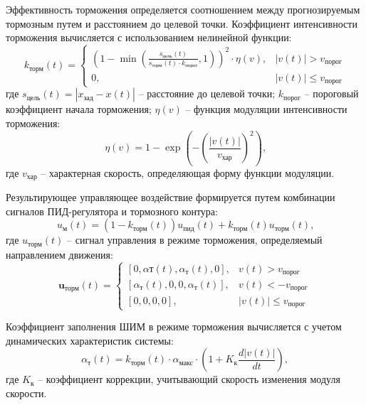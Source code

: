 Эффективность торможения определяется соотношением между прогнозируемым тормозным путем
и расстоянием до целевой точки. Коэффициент интенсивности торможения вычисляется с использованием нелинейной функции:
\begin{equation}\label{eq:braking_intensity_expanded}
	k_{\text{торм}}(t) = \begin{cases}
		\left(1 - \min\left(\frac{s_{\text{цель}}(t)}{s_{\text{торм}}(t) \cdot k_{\text{порог}}}, 1\right)\right)^2 \cdot \eta(v), & |v(t)| > v_{\text{порог}}    \\
		0,                                                                                                                         & |v(t)| \leq v_{\text{порог}}
	\end{cases}
\end{equation}
где $s_{\text{цель}}(t) = |x_{\text{зад}} - x(t)|$ -- расстояние до целевой точки;
$k_{\text{порог}}$ -- пороговый коэффициент начала торможения;
$\eta(v)$ -- функция модуляции интенсивности торможения:
\begin{equation}\label{eq:modulation_function}
	\eta(v) = 1 - \exp\left(-\left(\frac{|v(t)|}{v_{\text{хар}}}\right)^2\right)\text{,}
\end{equation}
где $v_{\text{хар}}$ -- характерная скорость, определяющая форму функции модуляции.

Результирующее управляющее воздействие формируется путем комбинации сигналов ПИД-регулятора и тормозного контура:
\begin{equation}\label{eq:combined_control}
	u_{\text{м}}(t) = (1 - k_{\text{торм}}(t))u_{\text{пид}}(t) + k_{\text{торм}}(t)u_{\text{торм}}(t)\text{,}
\end{equation}
где $u_{\text{торм}}(t)$ -- сигнал управления в режиме торможения, определяемый направлением движения:
\begin{equation}\label{eq:braking_control_expanded}
	\mathbf{u}_{\text{торм}}(t) = \begin{cases}
		[0, \alpha{\text{т}}(t), \alpha_{\text{т}}(t), 0],  & v(t) > v_{\text{порог}}      \\
		[\alpha_{\text{т}}(t), 0, 0, \alpha_{\text{т}}(t)], & v(t) < -v_{\text{порог}}     \\
		[0, 0, 0, 0],                                       & |v(t)| \leq v_{\text{порог}}
	\end{cases}
\end{equation}

Коэффициент заполнения ШИМ в режиме торможения вычисляется с учетом динамических характеристик системы:
\begin{equation}\label{eq:braking_pwm_expanded}
	\alpha_{\text{т}}(t) = k_{\text{торм}}(t) \cdot \alpha_{\text{макс}} \cdot \left(1 + K_{\text{к}}\frac{d|v(t)|}{dt}\right),
\end{equation}
где $K_{\text{к}}$ -- коэффициент коррекции, учитывающий скорость изменения модуля скорости.

